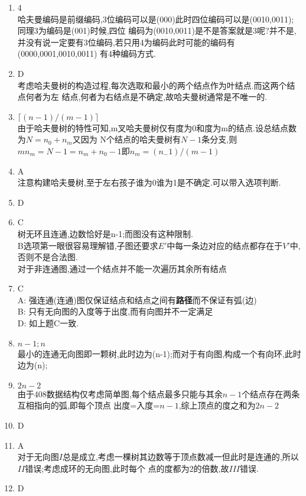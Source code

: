 \documentclass[12pt, a4paper, oneside, UTF8]{ctexbook}
\begin{document}
\begin{enumerate}[label=\arabic*.\textbf{答案}:]
    \item 4 \\
    哈夫曼编码是前缀编码,3位编码可以是(000)此时四位编码可以是(0010,0011);同理3为编码是(001)时候,四位
    编码为(0010,0011)是不是答案就是3呢?并不是,并没有说一定要有3位编码,若只用4为编码此时可能的编码有(0000,0001,0010,0011)
    有4种编码方式. 
    \item D \\
    考虑哈夫曼树的构造过程,每次选取和最小的两个结点作为叶结点.而这两个结点何者为左
    结点,何者为右结点是不确定,故哈夫曼树通常是不唯一的. 
    \item $\lceil(n-1)/(m-1)\rceil$ \\
    由于哈夫曼树的特性可知,m叉哈夫曼树仅有度为0和度为m的结点.设总结点数为$N=n_0+n_m$又因为
    N个结点的哈夫曼树有$N-1$条分支,则$mn_m=N-1=n_m+n_0-1$即$n_m=(n_-1)/(m-1)$
    \item A \\
    注意构建哈夫曼树,至于左右孩子谁为0谁为1是不确定.可以带入选项判断. 
    \item D
    \item C \\
    树无环且连通,边数恰好是n-1;而图没有这种限制. \\
    B选项第一眼很容易理解错,子图还要求$E'$中每一条边对应的结点都存在于$V'$中,否则不是合法图. \\
    对于非连通图,通过一个结点并不能一次遍历其余所有结点 
    \item C \\
    A: 强连通(连通)图仅保证结点和结点之间有\textbf{路径}而不保证有弧(边) \\
    B: 只有无向图的入度等于出度,而有向图并不一定满足 \\
    D: 如上题C一致.  
    \item $n-1;n$ \\
    最小的连通无向图即一颗树,此时边为(n-1);而对于有向图,构成一个有向环,此时边为(n);
    \item $2n-2$ \\
    由于408数据结构仅考虑简单图,每个结点最多只能与其余$n-1$个结点存在两条互相指向的弧,即每个顶点
    出度=入度=$n-1$,综上顶点的度之和为$2n-2$ 
    \item D 
    \item A \\
    对于无向图$I$总是成立,考虑一棵树其边数等于顶点数减一但此时是连通的,所以$II$错误;考虑成环的无向图,此时每个
    点的度都为2的倍数,故$III$错误. 
    \item D \\

\end{enumerate}
\end{document}
